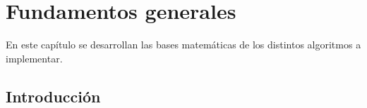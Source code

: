 \chapter{Fundamentos generales}
En este capítulo se desarrollan las bases matemáticas de los distintos algoritmos a implementar.
\section{Introducción}
 
